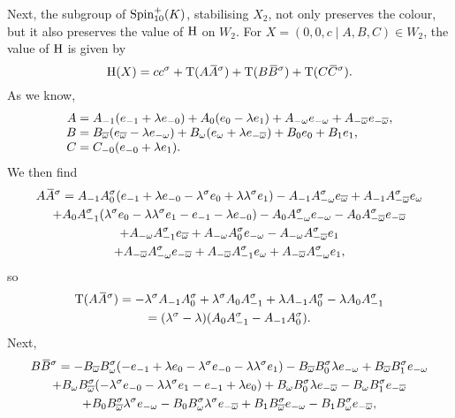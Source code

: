 Next, the subgroup of $\mathrm{Spin}_{10}^+(K)$, stabilising $X_2$, not only preserves the colour, 
but it also preserves the value 
of $\mathrm{H}$ on $W_2$. For $X = (0,0,c\mid A,B,C) \in W_2$, 
the value of $\mathrm{H}$ is given by
\begin{equation}
	\H(X) = c c^{\s} + \Tr(A\ovA^{\s}) + \Tr(B\ovB^{\s}) + \Tr(C\ovC^{\s}). 
\end{equation}
As we know,
\begin{equation}
	\begin{array}{r@{\;}c@{\;}l}
		A & = & A_{-1} (e_{-1} + \lambda e_{-0}) + A_0 (e_0 - \lambda e_1) + 
				A_{-\omega} e_{-\omega} + A_{-\bar{\omega}} e_{-\bar{\omega}}, \\
				
		B & = & B_{\bar{\omega}} ( e_{\bar{\omega}} - \lambda e_{-\omega} ) +
				B_{\omega} ( e_{\omega} + \lambda e_{-\bar{\omega}} ) + 
				B_0 e_0 + B_1 e_1, \\
				
		C & = & C_{-0} ( e_{-0} + \lambda e_1 ).
	\end{array}
\end{equation}
We then find
\begin{multline}
	A\mathord{\mbox{\hspace*{0pt}}\,\overline{\!A\!\!\;}\!\:}\mbox{\hspace*{0pt}}^{\sigma} = A_{-1} A_0^{\sigma} ( e_{-1} + \lambda e_{-0} - \lambda^{\sigma} e_0 + 
						\lambda \lambda^{\sigma} e_1 ) - 
	A_{-1} A_{-\omega}^{\sigma} e_{\overline{\omega}} + A_{-1} A_{-\overline{\omega}}^{\sigma} e_{\omega} \\	
	+ A_0 A_{-1}^{\sigma} (\lambda^{\sigma} e_0 - \lambda \lambda^{\sigma} e_1 - e_{-1} - \lambda e_{-0} ) -
	A_0 A_{-\omega}^{\sigma} e_{-\omega} - A_0 A_{-\overline{\omega}}^{\sigma} e_{-\overline{\omega}} \\	
	+ A_{-\omega} A_{-1}^{\sigma} e_{\overline{\omega}} + A_{-\omega} A_0^{\sigma} e_{-\omega}  - 
	A_{-\omega} A_{-\overline{\omega}}^{\sigma} e_1 \\
	+ A_{-\overline{\omega}} A_{-\omega}^{\sigma} e_{-\overline{\omega}} + 
	A_{-\overline{\omega}} A_{-1}^{\sigma} e_{\omega} + A_{-\overline{\omega}} A_{-\omega}^{\sigma} e_1,
\end{multline}
so 
\begin{multline}
	\operatorname{T}(A\mathord{\mbox{\hspace*{0pt}}\,\overline{\!A\!\!\;}\!\:}\mbox{\hspace*{0pt}}^{\sigma}) = -\lambda^{\sigma} A_{-1} A_0^{\sigma} + \lambda^{\sigma} A_0 A_{-1}^{\sigma} + 
						\lambda A_{-1} A_0^{\sigma} - \lambda A_0 A_{-1}^{\sigma} \\
						= (\lambda^{\sigma} - \lambda)( A_0 A_{-1}^{\sigma} - A_{-1} A_0^{\sigma} ).
\end{multline}
Next,
\begin{multline}
	B\mathord{\mbox{\hspace*{0pt}}\,\overline{\!B\!\!\;}\!\:}\mbox{\hspace*{0pt}}^{\sigma} = -B_{\overline{\omega}}B_{\omega}^{\sigma} ( -e_{-1} + \lambda e_0 - \lambda^{\sigma} e_{-0}
					- \lambda \lambda^{\sigma} e_1) - B_{\overline{\omega}} B_0^{\sigma} \lambda e_{-\omega} 
					+ B_{\overline{\omega}} B_1^{\sigma} e_{-\omega} \\
	+ B_{\omega}B_{\overline{\omega}}^{\sigma} ( -\lambda^{\sigma} e_{-0} -\lambda \lambda^{\sigma} e_1 - e_{-1}
					+ \lambda e_0) + B_{\omega}B_0^{\sigma} \lambda e_{-\overline{\omega}} - 
					B_{\omega} B_1^{\sigma} e_{-\overline{\omega}} \\
	+ B_0 B_{\overline{\omega}}^{\sigma} \lambda^{\sigma} e_{-\omega} - B_0 B_{\omega}^{\sigma} \lambda^{\sigma}
					e_{-\overline{\omega}} + B_1 B_{\overline{\omega}}^{\sigma} e_{-\omega}
					- B_1 B_{\omega}^{\sigma} e_{-\overline{\omega}},
\end{multline}
